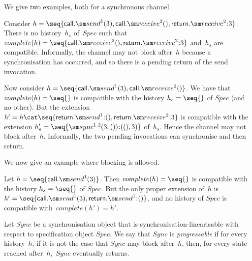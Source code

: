 
We give two examples, both for a synchronous channel.
%
\begin{example}
Consider $h = \seq{ \call.\send^1(3), \call.\receive^2(),
  \return.\receive^2\::3 }$.  There is no history~$h_s$ of~$Spec$ such that
$complete(h) = \seq{\call.\receive^2(),\linebreak[1] \return.\receive^2\::3
}$ and~$h_s$ are compatible.  
Informally, the channel may not block after~$h$ because a synchronisation has
occurred, and so there is a pending return of the send invocation.
\end{example}

\begin{example}
Now consider $h = \seq{\call.\send^1(3), \call.\receive^2()}$.  We have that
$complete(h) = \seq{}$ is compatible with the history $h_s = \seq{}$ of $Spec$
(and no other). But the extension $h' = h \cat
\seq{\return.\send^1\::(),\linebreak[1] \return.\receive^2\::3}$ is compatible
with the extension $h_s' = \linebreak[1] \seq{\sync^{1,2}(3,()) \:: ((),3)}$
of~$h_s$.  Hence the channel may not block after~$h$.  Informally, the two
pending invocations can synchronise and then return. 
\end{example}

We now give an example where blocking is allowed.
%
\begin{example}  
Let $h = \seq{\call.\send^1(3)}$.  Then $complete(h) = \seq{}$ is compatible
with the history $h_s = \seq{}$ of $Spec$.  But the only proper extension
of~$h$ is $h' = \seq{\call.\send^1(3),\linebreak[1] \return.\send^1\::()}$,
and no history of $Spec$ is compatible with~$complete(h') = h'$.
\end{example}



\begin{definition}
Let $Sync$ be a synchronisation object that is synchronisation-linearisable
with respect to specification object $Spec$.  We say that $Sync$ is
\emph{progressable} if for every history~$h$, if it is not the case that
$Sync$ may block after~$h$, then, for every state reached after~$h$,\, $Sync$
eventually returns.
\end{definition}

